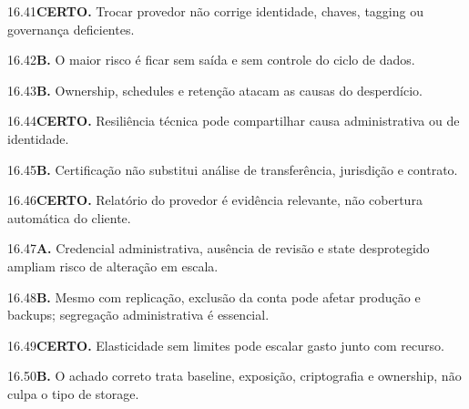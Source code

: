 \begin{solucao}{16.41}\textbf{CERTO.} Trocar provedor não corrige identidade, chaves, tagging ou governança deficientes.\end{solucao}
\begin{solucao}{16.42}\textbf{B.} O maior risco é ficar sem saída e sem controle do ciclo de dados.\end{solucao}
\begin{solucao}{16.43}\textbf{B.} Ownership, schedules e retenção atacam as causas do desperdício.\end{solucao}
\begin{solucao}{16.44}\textbf{CERTO.} Resiliência técnica pode compartilhar causa administrativa ou de identidade.\end{solucao}
\begin{solucao}{16.45}\textbf{B.} Certificação não substitui análise de transferência, jurisdição e contrato.\end{solucao}
\begin{solucao}{16.46}\textbf{CERTO.} Relatório do provedor é evidência relevante, não cobertura automática do cliente.\end{solucao}
\begin{solucao}{16.47}\textbf{A.} Credencial administrativa, ausência de revisão e state desprotegido ampliam risco de alteração em escala.\end{solucao}
\begin{solucao}{16.48}\textbf{B.} Mesmo com replicação, exclusão da conta pode afetar produção e backups; segregação administrativa é essencial.\end{solucao}
\begin{solucao}{16.49}\textbf{CERTO.} Elasticidade sem limites pode escalar gasto junto com recurso.\end{solucao}
\begin{solucao}{16.50}\textbf{B.} O achado correto trata baseline, exposição, criptografia e ownership, não culpa o tipo de storage.\end{solucao}

